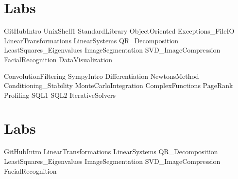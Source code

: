 \documentclass[opener-c,labs,blue,nociteref]{HJnewsiambook}
\begin{document}
\ifbyu

\part{Labs} %
{GitHubIntro}
{UnixShell1}
{StandardLibrary}
{ObjectOriented}
{Exceptions_FileIO}
{LinearTransformations}
{LinearSystems}
{QR_Decomposition}
{LeastSquares_Eigenvalues}
{ImageSegmentation}
{SVD_ImageCompression}
{FacialRecognition}
{DataVisualization}

{ConvolutionFiltering}
{SympyIntro}
{Differentiation}
{NewtonsMethod}
{Conditioning_Stability}
{MonteCarloIntegration}
{ComplexFunctions}
{PageRank}
{Profiling}
{SQL1}
{SQL2}
{IterativeSolvers}

\else 

\part{Labs} %
{GitHubIntro}
{LinearTransformations}
{LinearSystems}
{QR_Decomposition}
{LeastSquares_Eigenvalues}
{ImageSegmentation}
{SVD_ImageCompression}
{FacialRecognition}
\end{document}
